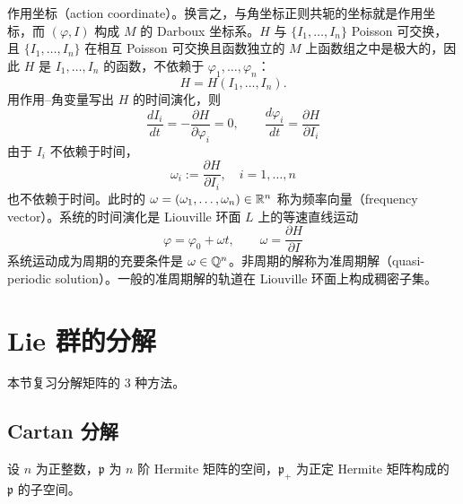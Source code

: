 作用坐标（action coordinate）。换言之，与角坐标正则共轭的坐标就是作用坐标，而 $(\varphi,I)$ 构成 $M$ 的 Darboux 坐标系。$H$ 与 $\{I_1,\dots,I_n\}$ Poisson 可交换，且 $\{I_1,\dots,I_n\}$ 在相互 Poisson 可交换且函数独立的 $M$ 上函数组之中是极大的，因此 $H$ 是 $I_1,\dots,I_n$ 的函数，不依赖于 $\varphi_1,\dots,\varphi_n$：
\begin{equation}
  H=H(I_1,\dots,I_n).
  \tag{6.1.7}
\end{equation}
用作用–角变量写出 $H$ 的时间演化，则
\begin{equation}
  \frac{dI_i}{dt}=-\frac{\partial H}{\partial\varphi_i}=0,\qquad
  \frac{d\varphi_i}{dt}=\frac{\partial H}{\partial I_i}
  \tag{6.1.8}
\end{equation}
由于 $I_i$ 不依赖于时间，
\begin{equation}
  \omega_i:=\frac{\partial H}{\partial I_i},\quad i=1,\dots,n
  \tag{6.1.9}
\end{equation}
也不依赖于时间。此时的 $\omega=(\omega_1,\dots,\omega_n)\in\mathbb{R}^n$ 称为频率向量（frequency vector）。系统的时间演化是 Liouville 环面 $L$ 上的等速直线运动
\begin{equation}
  \varphi=\varphi_0+\omega t,\qquad \omega=\frac{\partial H}{\partial I}
  \tag{6.1.10}
\end{equation}
系统运动成为周期的充要条件是 $\omega\in\mathbb{Q}^n$。非周期的解称为准周期解（quasi-periodic solution）。一般的准周期解的轨道在 Liouville 环面上构成稠密子集。

\section{Lie 群的分解}

本节复习分解矩阵的 3 种方法。


\subsection{Cartan 分解}

设 $n$ 为正整数，$\mathfrak{p}$ 为 $n$ 阶 Hermite 矩阵的空间，$\mathfrak{p}_+$ 为正定 Hermite 矩阵构成的 $\mathfrak{p}$ 的子空间。

